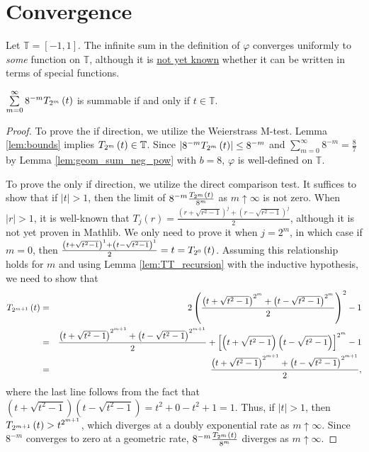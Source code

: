 \renewcommand{\thetheorem}{\thesection.\arabic{theorem}}

\section{Convergence}\label{sec:Convergence}

Let $\mathbb{T} = \left[-1,1\right]$. The infinite sum in the definition of $\varphi$ converges uniformly to \emph{some} function on $\mathbb{T}$, although it is \underline{not yet known} whether it can be written in terms of special functions. 

\begin{lemma}[]
  \label{lem:summable}
  \leanok
  $\sum\limits_{m = 0}^\infty 8^{-m} \TT[t]{m}$ is summable if and only if $t \in \mathbb{T}$.
\end{lemma}
  
\begin{proof}
  \leanok
  To prove the if direction, we utilize the Weierstrass M-test. Lemma \ref{lem:bounds} implies $\TT[t]{m} \in \mathbb{T}$. Since $\left|8^{-m} \TT[t]{m}\right| \leq 8^{-m}$ and $\sum\limits_{m = 0}^\infty 8^{-m} = \frac{8}{7}$ by Lemma \ref{lem:geom_sum_neg_pow} with $b = 8$, $\varphi$ is well-defined on $\mathbb{T}$.

  To prove the only if direction, we utilize the direct comparison test. It suffices to show that if $\left|t\right| > 1$, then the limit of $8^{-m} \frac{\TT[t]{m}}{8^{m}}$ as $m \uparrow \infty$ is not zero. When $\left|r\right| > 1$, it is well-known that $T_j\left(r\right) = \frac{\left(r + \sqrt{r^2 - 1}\right)^j + \left(r - \sqrt{r^2 - 1}\right)^j}{2}$, although it is not yet proven in Mathlib. We only need to prove it when $j = 2^m$, in which case if $m = 0$, then $\frac{\left(t + \sqrt{t^2 - 1}\right)^1 + \left(t - \sqrt{t^2 - 1}\right)^1}{2} = t = \TT[t]{0}$. Assuming this relationship holds for $m$ and using Lemma \ref{lem:TT_recursion} with the inductive hypothesis, we need to show that 
  \begin{eqnarray*}
  \TT[t]{m + 1} &=& 
  2 \left(\frac{\left(t + \sqrt{t^2 - 1}\right)^{2^m} + \left(t - \sqrt{t^2 - 1}\right)^{2^m}}{2}\right)^2 - 1 \\ &=&
  \frac{\left(t + \sqrt{t^2 - 1}\right)^{2^{m + 1}} + \left(t - \sqrt{t^2 - 1}\right)^{2^{m + 1}}}{2} +
  \left[\left(t + \sqrt{t^2 - 1}\right) \left(t - \sqrt{t^2 - 1}\right)\right]^{2^m} - 1 \\ &=&
  \frac{\left(t + \sqrt{t^2 - 1}\right)^{2^{m + 1}} + \left(t - \sqrt{t^2 - 1}\right)^{2^{m + 1}}}{2},
  \end{eqnarray*}
  where the last line follows from the fact that $\left(t + \sqrt{t^2 - 1}\right) \left(t - \sqrt{t^2 - 1}\right) = t^2 + 0 - t^2 + 1 = 1$. Thus, if $\left|t\right| > 1$, then $\TT[t]{m + 1} > t^{2^{m + 1}}$, which diverges at a doubly exponential rate as $m \uparrow \infty$. Since $8^{-m}$ converges to zero at a geometric rate, 
  $8^{-m} \frac{\TT[t]{m}}{8^{m}}$ diverges as $m \uparrow \infty$.
\end{proof}

